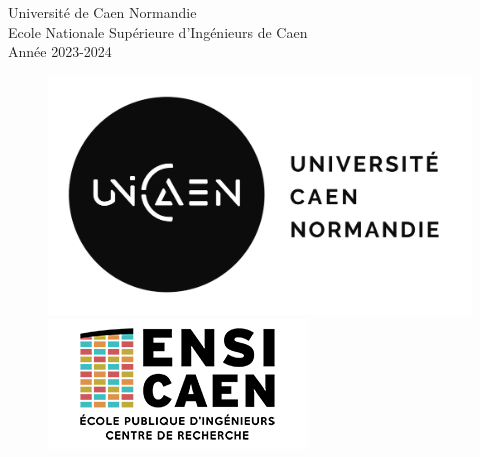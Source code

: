 \documentclass[12pt, a4paper]{article}
\begin{document}
\begin{titlepage}
    \vspace{2cm}
    {\large Université de Caen Normandie \\ Ecole Nationale Supérieure d'Ingénieurs de Caen \\ Année 2023-2024\par}
    \begin{figure}[h!]
        \centering
        \begin{minipage}{0.35\textwidth}
            \centering
             \includegraphics[width=\linewidth]{Images/Others/logo_unicaen.png}
        \end{minipage}
        \hfill %
        \begin{minipage}{0.35\textwidth}
            \centering
            \includegraphics[width=\linewidth]{Images/Others/logo_ensicaen.png}
        \end{minipage}
    \end{figure}
    


\end{titlepage}
\end{document}
